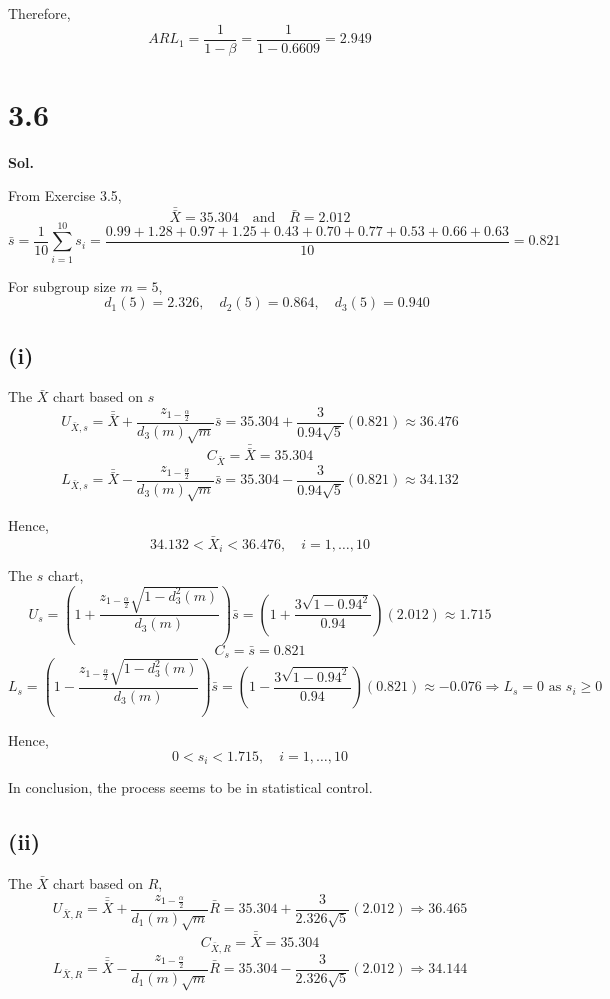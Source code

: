 \documentclass[a4paper, 12pt]{article}  %
\begin{document}
Therefore,
$$
ARL_1=\frac{1}{1-\beta}=\frac{1}{1-0.6609}=2.949
$$

\section*{3.6}
\textbf{Sol.}

From Exercise 3.5,
$$
\bar{\bar X}=35.304
\quad\text{and}\quad
\bar R=2.012
$$
$$
\bar s
=\frac{1}{10}\sum_{i=1}^{10}s_i
=\frac{0.99+1.28+0.97+1.25+0.43+0.70+0.77+0.53+0.66+0.63}{10}
=0.821
$$

For subgroup size \(m=5\),
$$
\quad d_1(5)=2.326,\quad d_2(5)=0.864,\quad d_3(5)=0.940
$$

\subsection*{(i)}

The \(\bar X\) chart based on \(s\)
$$
U_{\bar X,s}=\bar{\bar X}+\frac{z_{1-\frac{\alpha}{2}}}{d_3(m)\sqrt m}\bar s=35.304+\frac{3}{0.94\sqrt 5}(0.821)\approx 36.476
$$
$$
C_{\bar X}=\bar{\bar X}=35.304
$$
$$
L_{\bar X,s}=\bar{\bar X}-\frac{z_{1-\frac{\alpha}{2}}}{d_3(m)\sqrt m}\bar s=35.304-\frac{3}{0.94\sqrt 5}(0.821)\approx 34.132
$$

Hence,
$$
34.132<\bar X_i<36.476,\quad i=1,\ldots,10
$$

The \(s\) chart,
$$
U_s=\left(1+\frac{z_{1-\frac{\alpha}{2}}\sqrt{1-d_3^2(m)}}{d_3(m)}\right)\bar s=\left(1+\frac{3\sqrt{1-0.94^2}}{0.94}\right)(2.012)\approx 1.715
$$
$$
C_s=\bar s=0.821
$$
$$
L_s=\left(1-\frac{z_{1-\frac{\alpha}{2}}\sqrt{1-d_3^2(m)}}{d_3(m)}\right)\bar s=\left(1-\frac{3\sqrt{1-0.94^2}}{0.94}\right)(0.821)\approx -0.076\Rightarrow L_s=0 \text{ as } s_i\ge0
$$

Hence,
$$
0<s_i<1.715,\quad i=1,\ldots,10
$$

In conclusion, the process seems to be in statistical control.
\\

\subsection*{(ii)}

The \(\bar X\) chart based on $R$,
$$
U_{\bar X,R}=\bar{\bar X}+\frac{z_{1-\frac{\alpha}{2}}}{d_1(m)\sqrt{m}}\bar R=35.304+\frac{3}{2.326\sqrt{5}}(2.012)\Rightarrow 36.465
$$
$$
C_{\bar X,R}=\bar{\bar X}=35.304
$$
$$
L_{\bar X,R}=\bar{\bar X}-\frac{z_{1-\frac{\alpha}{2}}}{d_1(m)\sqrt{m}}\bar R=35.304-\frac{3}{2.326\sqrt{5}}(2.012)\Rightarrow 34.144
$$
\end{document}
